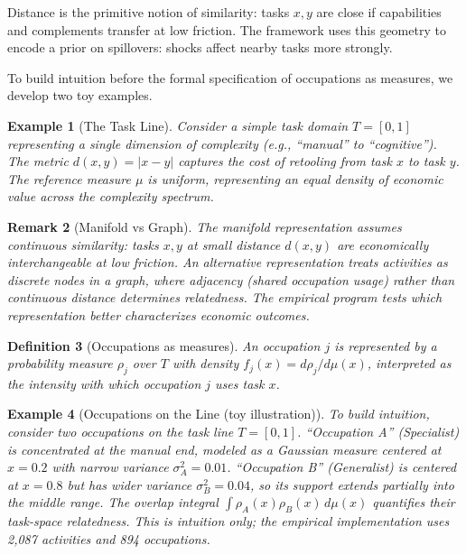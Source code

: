 \documentclass[12pt]{article}
\newtheorem{definition}{Definition}[section]
\newtheorem{remark}[definition]{Remark}
\newtheorem{example}[definition]{Example}
\begin{document}
Distance is the primitive notion of similarity: tasks $x, y$ are close if capabilities and complements transfer at low friction. The framework uses this geometry to encode a prior on spillovers: shocks affect nearby tasks more strongly.


To build intuition before the formal specification of occupations as measures, we develop two toy examples.


\begin{example}[The Task Line]
\label{ex:task-line}
Consider a simple task domain $T = [0, 1]$ representing a single dimension of complexity (e.g., ``manual'' to ``cognitive''). The metric $d(x, y) = |x - y|$ captures the cost of retooling from task $x$ to task $y$. The reference measure $\mu$ is uniform, representing an equal density of economic value across the complexity spectrum.
\end{example}


\begin{remark}[Manifold vs Graph]
\label{rem:graph-vs-manifold}
The manifold representation assumes continuous similarity: tasks $x, y$ at small distance $d(x,y)$ are economically interchangeable at low friction. An alternative representation treats activities as discrete nodes in a graph, where adjacency (shared occupation usage) rather than continuous distance determines relatedness. The empirical program tests which representation better characterizes economic outcomes.
\end{remark}


\begin{definition}[Occupations as measures]
\label{def:occupations}
An occupation $j$ is represented by a probability measure $\rho_j$ over $T$ with density $f_j(x) = d\rho_j / d\mu(x)$, interpreted as the intensity with which occupation $j$ uses task $x$.
\end{definition}


\begin{example}[Occupations on the Line (toy illustration)]
\label{ex:occupations-line}
To build intuition, consider two occupations on the task line $T = [0,1]$. ``Occupation A'' (Specialist) is concentrated at the manual end, modeled as a Gaussian measure centered at $x=0.2$ with narrow variance $\sigma_A^2 = 0.01$. ``Occupation B'' (Generalist) is centered at $x=0.8$ but has wider variance $\sigma_B^2 = 0.04$, so its support extends partially into the middle range. The overlap integral $\int \rho_A(x) \rho_B(x)\, d\mu(x)$ quantifies their task-space relatedness. This is intuition only; the empirical implementation uses 2,087 activities and 894 occupations.
\end{example}
\end{document}
